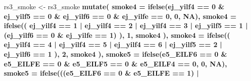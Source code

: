 \documentclass[]{book}
\newenvironment{Shaded}{\begin{snugshade}}{\end{snugshade}}
\newcommand{\DataTypeTok}[1]{\textcolor[rgb]{0.13,0.29,0.53}{#1}}
\newcommand{\DecValTok}[1]{\textcolor[rgb]{0.00,0.00,0.81}{#1}}
\newcommand{\KeywordTok}[1]{\textcolor[rgb]{0.13,0.29,0.53}{\textbf{#1}}}
\newcommand{\NormalTok}[1]{#1}
\newcommand{\OperatorTok}[1]{\textcolor[rgb]{0.81,0.36,0.00}{\textbf{#1}}}
\newcommand{\OtherTok}[1]{\textcolor[rgb]{0.56,0.35,0.01}{#1}}
\newcommand{\StringTok}[1]{\textcolor[rgb]{0.31,0.60,0.02}{#1}}
\begin{document}
\begin{Shaded}
\begin{Highlighting}[]
{{{{\NormalTok{rs3_smoke <-}\StringTok{ }\NormalTok{rs3_smoke }\OperatorTok{%
\StringTok{  }\KeywordTok{mutate}\NormalTok{(}
    \DataTypeTok{smoke4 =} \KeywordTok{ifelse}\NormalTok{(ej_yilf4 }\OperatorTok{==}\StringTok{ }\DecValTok{0} \OperatorTok{&}
\StringTok{                      }\NormalTok{ej_yilf5 }\OperatorTok{==}\StringTok{ }\DecValTok{0} \OperatorTok{&}\StringTok{ }\NormalTok{ej_yilf6 }\OperatorTok{==}\StringTok{ }\DecValTok{0} \OperatorTok{&}\StringTok{ }\NormalTok{ej_yilfe }\OperatorTok{==}\StringTok{ }\DecValTok{0}\NormalTok{, }\DecValTok{0}\NormalTok{, }\OtherTok{NA}\NormalTok{),}
    \DataTypeTok{smoke4 =} \KeywordTok{ifelse}\NormalTok{((}
\NormalTok{      ej_yilf4 }\OperatorTok{==}\StringTok{ }\DecValTok{1} \OperatorTok{|}
\StringTok{        }\NormalTok{ej_yilf4 }\OperatorTok{==}\StringTok{ }\DecValTok{2} \OperatorTok{|}
\StringTok{        }\NormalTok{ej_yilf4 }\OperatorTok{==}\StringTok{ }\DecValTok{3} \OperatorTok{|}
\StringTok{        }\NormalTok{ej_yilf5 }\OperatorTok{==}\StringTok{ }\DecValTok{1} \OperatorTok{|}\StringTok{ }\NormalTok{(ej_yilf6 }\OperatorTok{==}\StringTok{ }\DecValTok{0} \OperatorTok{&}\StringTok{ }\NormalTok{ej_yilfe }\OperatorTok{==}\StringTok{ }\DecValTok{1}\NormalTok{)}
\NormalTok{    ),}
    \DecValTok{1}\NormalTok{,}
\NormalTok{    smoke4}
\NormalTok{    ),}
    \DataTypeTok{smoke4 =} \KeywordTok{ifelse}\NormalTok{((}
\NormalTok{      ej_yilf4 }\OperatorTok{==}\StringTok{ }\DecValTok{4} \OperatorTok{|}
\StringTok{        }\NormalTok{ej_yilf4 }\OperatorTok{==}\StringTok{ }\DecValTok{5} \OperatorTok{|}
\StringTok{        }\NormalTok{ej_yilf4 }\OperatorTok{==}\StringTok{ }\DecValTok{6} \OperatorTok{|}\StringTok{ }\NormalTok{ej_yilf5 }\OperatorTok{==}\StringTok{ }\DecValTok{2} \OperatorTok{|}\StringTok{ }\NormalTok{ej_yilf6 }\OperatorTok{==}\StringTok{ }\DecValTok{1}
\NormalTok{    ),}
    \DecValTok{2}\NormalTok{,}
\NormalTok{    smoke4}
\NormalTok{    ),}
    \DataTypeTok{smoke5 =} \KeywordTok{ifelse}\NormalTok{(e5_EILF6 }\OperatorTok{==}\StringTok{ }\DecValTok{0} \OperatorTok{&}
\StringTok{                      }\NormalTok{e5_EILFE }\OperatorTok{==}\StringTok{ }\DecValTok{0} \OperatorTok{&}\StringTok{ }\NormalTok{e5_EILF5 }\OperatorTok{==}\StringTok{ }\DecValTok{0} \OperatorTok{&}\StringTok{ }\NormalTok{e5_EILF4 }\OperatorTok{==}\StringTok{ }\DecValTok{0}\NormalTok{, }\DecValTok{0}\NormalTok{, }\OtherTok{NA}\NormalTok{),}
    \DataTypeTok{smoke5 =} \KeywordTok{ifelse}\NormalTok{(((e5_EILF6 }\OperatorTok{==}\StringTok{ }\DecValTok{0} \OperatorTok{&}
\StringTok{                        }\NormalTok{e5_EILFE }\OperatorTok{==}\StringTok{ }\DecValTok{1}\NormalTok{) }\OperatorTok{|}
}}}}}
\end{Highlighting}
\end{Shaded}
\end{document}
